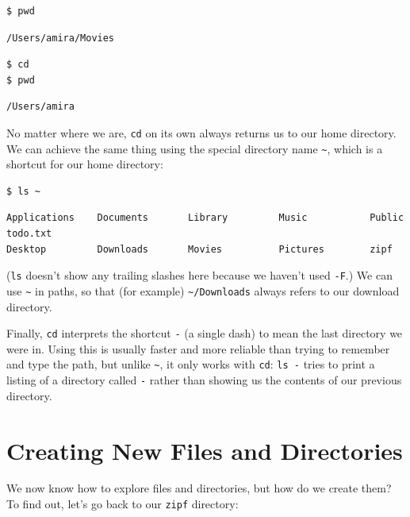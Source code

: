 \documentclass[
]{krantz}
\begin{document}
\begin{verbatim}
$ pwd
\end{verbatim}

\begin{verbatim}
/Users/amira/Movies
\end{verbatim}

\begin{verbatim}
$ cd
$ pwd
\end{verbatim}

\begin{verbatim}
/Users/amira
\end{verbatim}

No matter where we are,
\texttt{cd} on its own always returns us to our home directory.
We can achieve the same thing using the special directory name \texttt{\textasciitilde{}},
which is a shortcut for our home directory:

\begin{verbatim}
$ ls ~
\end{verbatim}

\begin{verbatim}
Applications    Documents       Library         Music           Public          todo.txt
Desktop         Downloads       Movies          Pictures        zipf
\end{verbatim}

(\texttt{ls} doesn't show any trailing slashes here because we haven't used \texttt{-F}.)
We can use \texttt{\textasciitilde{}} in paths,
so that (for example) \texttt{\textasciitilde{}/Downloads} always refers to our download directory.

Finally,
\texttt{cd} interprets the shortcut \texttt{-} (a single dash) to mean the last directory we were in.
Using this is usually faster and more reliable than trying to remember and type the path,
but unlike \texttt{\textasciitilde{}},
it only works with \texttt{cd}:
\texttt{ls~-} tries to print a listing of a directory called \texttt{-}
rather than showing us the contents of our previous directory.

\hypertarget{bash-basics-filedir}{%
\section{Creating New Files and Directories}\label{bash-basics-filedir}}

We now know how to explore files and directories,
but how do we create them?
To find out,
let's go back to our \texttt{zipf} directory:
\end{document}
